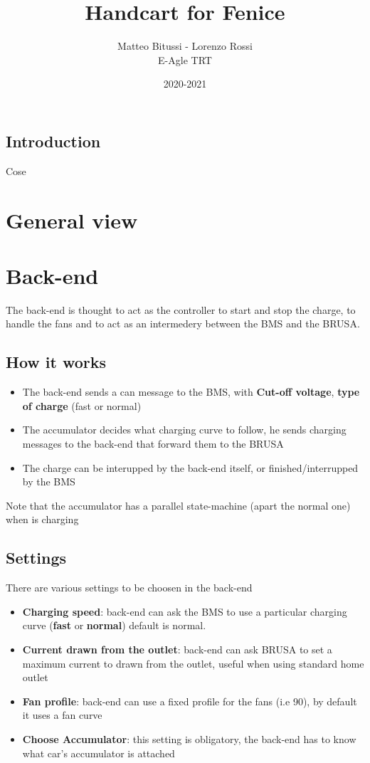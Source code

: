 \documentclass[a4paper]{report}
\title{Handcart for Fenice}
\author{Matteo Bitussi - Lorenzo Rossi\\ E-Agle TRT}
\date{2020-2021}
\begin{document}
  \maketitle

  \tableofcontents

  \section*{Introduction}
  Cose

  \chapter{General view}

  \chapter{Back-end}
  The back-end is thought to act as the controller to start and stop the charge, to handle the fans and to act as an intermedery between the BMS and the BRUSA.
  \section{How it works}
  \begin{itemize}
    \item The back-end sends a can message to the BMS, with \textbf{Cut-off voltage}, \textbf{type of charge} (fast or normal)
    \item The accumulator decides what charging curve to follow, he sends charging messages to the back-end that forward them to the BRUSA
    \item The charge can be interupped by the back-end itself, or finished/interrupped by the BMS
  \end{itemize}
  Note that the accumulator has a parallel state-machine (apart the normal one) when is charging

  \section{Settings}
  There are various settings to be choosen in the back-end
  \begin{itemize}
    \item \textbf{Charging speed}: back-end can ask the BMS to use a particular charging curve (\textbf{fast} or \textbf{normal}) default is normal.
    \item \textbf{Current drawn from the outlet}: back-end can ask BRUSA to set a maximum current to drawn from the outlet, useful when using standard home outlet
    \item \textbf{Fan profile}: back-end can use a fixed profile for the fans (i.e 90), by default it uses a fan curve
    \item \textbf{Choose Accumulator}: this setting is obligatory, the back-end has to know what car's accumulator is attached
  \end{itemize}
\end{document}
